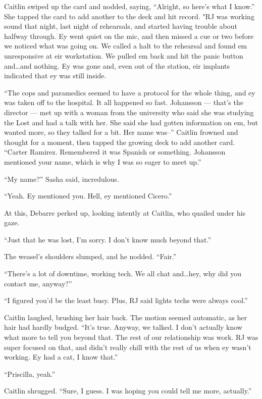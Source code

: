 Caitlin swiped up the card and nodded, saying, ``Alright, so here's what I know.'' She tapped the card to add another to the deck and hit record. "RJ was working sound that night, last night of rehearsals, and started having trouble about halfway through. Ey went quiet on the mic, and then missed a cue or two before we noticed what was going on. We called a halt to the rehearsal and found em unresponsive at eir workstation. We pulled em back and hit the panic button and\ldots{}and nothing. Ey was gone and, even out of the station, eir implants indicated that ey was still inside.

``The cops and paramedics seemed to have a protocol for the whole thing, and ey was taken off to the hospital. It all happened so fast. Johansson --- that's the director --- met up with a woman from the university who said she was studying the Lost and had a talk with her. She said she had gotten information on em, but wanted more, so they talked for a bit. Her name was--'' Caitlin frowned and thought for a moment, then tapped the growing deck to add another card. ``Carter Ramirez. Remembered it was Spanish or something. Johansson mentioned your name, which is why I was so eager to meet up.''

``My name?'' Sasha said, incredulous.

``Yeah. Ey mentioned you. Hell, ey mentioned Cicero.''

At this, Debarre perked up, looking intently at Caitlin, who quailed under his gaze.

``Just that he was lost, I'm sorry. I don't know much beyond that.''

The weasel's shoulders slumped, and he nodded. ``Fair.''

``There's a lot of downtime, working tech. We all chat and\ldots{}hey, why did you contact me, anyway?''

``I figured you'd be the least busy. Plus, RJ said lights techs were always cool.''

Caitlin laughed, brushing her hair back. The motion seemed automatic, as her hair had hardly budged. ``It's true. Anyway, we talked. I don't actually know what more to tell you beyond that. The rest of our relationship was work. RJ was super focused on that, and didn't really chill with the rest of us when ey wasn't working. Ey had a cat, I know that.''

``Priscilla, yeah.''

Caitlin shrugged. ``Sure, I guess. I was hoping you could tell me more, actually.''


